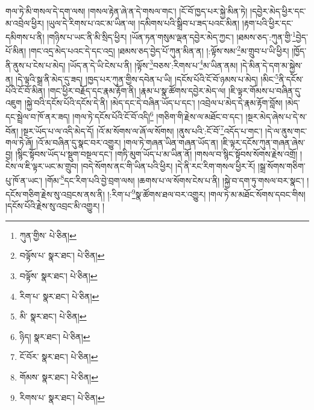 གལ་ཏེ་མི་གསལ་དེ་དག་ལས། །གསལ་རྟེན་ཞེ་ན་དེ་གསལ་གང་། །ངོ་བོ་ཁྱད་པར་སྐྱེ་མིན་ཏེ། །དབྱེར་མེད་ཕྱིར་དང་མ་འབྲེལ་ཕྱིར། །ཡུལ་དེ་རིགས་པ་འང་མ་ཡིན་ལ། །དམིགས་པའི་སྒྲིབ་པ་ཟད་པའང་མིན། །རྟག་པའི་ཕྱིར་དང་དམིགས་པ་ནི། །གཉིས་པ་ཡང་ནི་མི་སྲིད་ཕྱིར། །ཡོན་ཏན་གསུམ་ལྡན་དབྱེར་མེད་ཀྱང་། །ཐམས་ཅད་:ཀུན་གྱི་\footnote{ཀུན་གྱིས་  པེ་ཅིན། }བྱེད་པོ་མིན། །གང་འདྲ་མེད་པའང་དེ་དང་འདྲ། །ཐམས་ཅད་བྱེད་པོ་ཀུན་མིན་ན། །:ལྟོས་སམ་\footnote{བལྟོས་པ་  སྣར་ཐང་།  པེ་ཅིན། }མ་གྲུབ་པ་ཡི་ཕྱིར། །ཁྱོད་ནི་ནུས་པ་ངེས་པ་མེད། །ཡོད་ན་དེ་ཡི་ངེས་པ་ནི། །ལྟོས་\footnote{བལྟོས་  སྣར་ཐང་།  པེ་ཅིན། }བཅས་:རིགས་པ་\footnote{རིག་པ་  སྣར་ཐང་།  པེ་ཅིན། }མ་ཡིན་ནམ། །དེ་མིན་དེ་དག་མ་སྐྱེས་ན། །དེ་ལྟའི་སྒྲ་ནི་མེད་དུ་ཟད། །ཁྱད་པར་ཀུན་གྱིས་དབེན་པ་ཡི། །དངོས་པོའི་ངོ་བོ་ཉམས་པ་མེད། །མིང་\footnote{མི་  སྣར་ཐང་།  པེ་ཅིན། }ནི་དངོས་པོའི་ངོ་བོ་མིན། །གང་ཕྱིར་བརྗོད་དང་རྣམ་རྟོག་ནི། །རྣམ་པ་སྣ་ཚོགས་དབྱེར་མེད་ལ། །ཇི་ལྟར་གོམས་པ་བཞིན་དུ་འཇུག །སྐྱེ་བའི་དངོས་པོའི་དངོས་དེ་ནི། །མེད་དང་དེ་བཞིན་ཡོད་པ་དང་། །འབྲེལ་པ་མེད་དེ་རྣམ་རྟོག་བློས། །མེད་དང་སྦྲེལ་བ་ཁོ་ནར་ཟད། །གལ་ཏེ་དངོས་པོའི་ངོ་བོ་འདི།\footnote{ཉིད།  སྣར་ཐང་།  པེ་ཅིན། } །གཅིག་གི་རྗེས་ལ་མཐོང་བ་དང་། །སྔར་མེད་ཞེས་པ་དེ་ས་བོན། །སྔར་ཡོད་པ་ལ་འདི་མེད་དོ། །འོ་མ་སོགས་ལ་ཞོ་ལ་སོགས། །ནུས་པའི་:ངོ་བོ་\footnote{ངོ་བོར་  སྣར་ཐང་།  པེ་ཅིན། }འདོད་པ་གང་། །དེ་ལ་ནུས་གང་གལ་ཏེ་ཞོ། །འོ་མ་བཞིན་དུ་སྣང་བར་འགྱུར། །གལ་ཏེ་གཞན་ཡིན་གཞན་ཡོད་ན། །ཇི་ལྟར་དངོས་ཀུན་གཞན་ཞེས་བྱ། །སྙིང་སྟོབས་ཡོད་པ་སྡུག་བསྔལ་དང་། །གཏི་མུག་ཡོད་པ་མ་ཡིན་ནོ། །གསལ་བ་སྙིང་སྟོབས་སོགས་རྗེས་འགྲོ། །ངེས་ལ་ཇི་ལྟར་ཡང་མ་གྲུབ། །བདེ་སོགས་ནང་གི་ཡིན་པའི་ཕྱིར། །དེ་ནི་རང་རིག་གསལ་ཕྱིར་རོ། །སྒྲ་སོགས་གཅིག་པུ་ཁོ་ན་ཡང་། །གོམ་\footnote{གོམས་  སྣར་ཐང་།  པེ་ཅིན། }དང་རིག་པའི་བྱེ་བྲག་ལས། །ཆགས་པ་ལ་སོགས་ངེས་པ་ནི། །སྐྱེ་བ་དག་ཏུ་གསལ་བར་སྣང་། །དངོས་གཅིག་རྗེས་སུ་འབྲངས་ནས་ནི། །:རིག་པ་\footnote{རིགས་པ་  སྣར་ཐང་།  པེ་ཅིན། }སྣ་ཚོགས་ཐལ་བར་འགྱུར། །གལ་ཏེ་མ་མཐོང་སོགས་དབང་གིས། །དངོས་པོའི་རྗེས་སུ་འབྲང་མི་འགྱུར། །
